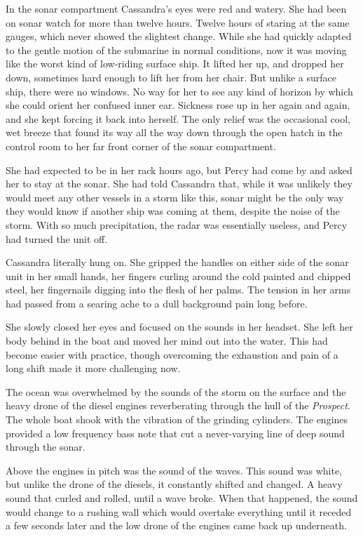 \documentclass[
]{scrbook}
\begin{document}
\bigskip

In the sonar compartment Cassandra's eyes were red and watery. She had
been on sonar watch for more than twelve hours. Twelve hours of staring
at the same gauges, which never showed the slightest change. While she
had quickly adapted to the gentle motion of the submarine in normal
conditions, now it was moving like the worst kind of low-riding surface
ship. It lifted her up, and dropped her down, sometimes hard enough to
lift her from her chair. But unlike a surface ship, there were no
windows. No way for her to see any kind of horizon by which she could
orient her confused inner ear. Sickness rose up in her again and again,
and she kept forcing it back into herself. The only relief was the
occasional cool, wet breeze that found its way all the way down through
the open hatch in the control room to her far front corner of the sonar
compartment.

She had expected to be in her rack hours ago, but Percy had come by and
asked her to stay at the sonar. She had told Cassandra that, while it
was unlikely they would meet any other vessels in a storm like this,
sonar might be the only way they would know if another ship was coming
at them, despite the noise of the storm. With so much precipitation, the
radar was essentially useless, and Percy had turned the unit off.

Cassandra literally hung on. She gripped the handles on either side of
the sonar unit in her small hands, her fingers curling around the cold
painted and chipped steel, her fingernails digging into the flesh of her
palms. The tension in her arms had passed from a searing ache to a dull
background pain long before.

She slowly closed her eyes and focused on the sounds in her headset. She
left her body behind in the boat and moved her mind out into the water.
This had become easier with practice, though overcoming the exhaustion
and pain of a long shift made it more challenging now.

The ocean was overwhelmed by the sounds of the storm on the surface and
the heavy drone of the diesel engines reverberating through the hull of
the \emph{Prospect}. The whole boat shook with the vibration of the
grinding cylinders. The engines provided a low frequency bass note that
cut a never-varying line of deep sound through the sonar.

Above the engines in pitch was the sound of the waves. This sound was
white, but unlike the drone of the diesels, it constantly shifted and
changed. A heavy sound that curled and rolled, until a wave broke. When
that happened, the sound would change to a rushing wall which would
overtake everything until it receded a few seconds later and the low
drone of the engines came back up underneath.
\end{document}
